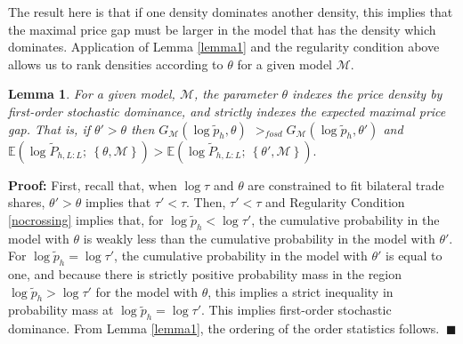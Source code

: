 \documentclass[12pt,dvips, ps2pdf]{article}
\newtheorem{lemma}{Lemma}
\begin{document}
The result here is that if one density dominates another density, this implies that the maximal price gap must be larger in the model that has the density which dominates. Application of Lemma \ref{lemma1} and the regularity condition above allows us to rank densities according to $\theta$ for a given model $\mathcal{M}$.
\begin{lemma}
\label{lemma2} For a given model, $\mathcal{M}$, the parameter $\theta$ indexes the price density by first-order stochastic dominance, and strictly indexes the expected maximal price gap. That is, if $\theta' > \theta$ then $G_{\mathcal{M}}(\log \tilde p_{h}, \theta)$ $>_{fosd} G_{\mathcal{M}}(\log \tilde p_{h}, \theta')$ and $\mathbb{E}\left(\log \tilde P_{h,L:L}; \ \left\{\theta,{\mathcal{M}}\right\} \right) > \mathbb{E}\left(\log \tilde P_{h,L:L}; \ \left\{\theta',{\mathcal{M}}\right\}\right).$
\end{lemma}
\vspace{-.25cm}
\textbf{Proof:} First, recall that, when $\log \tau$ and $\theta$ are constrained to fit bilateral trade shares, $\theta' > \theta$ implies that $\tau' < \tau$. Then, $\tau' < \tau$ and Regularity Condition \ref{nocrossing} implies that, for $\log \tilde p_{h} < \log \tau'$, the cumulative probability in the model with $\theta$ is weakly less than the cumulative probability in the model with $\theta'$. For $\log \tilde p_{h} = \log \tau'$, the cumulative probability in the model with $\theta'$ is equal to one, and because there is strictly positive probability mass in the region $\log \tilde p_{h} > \log \tau'$ for the model with $\theta$, this implies a strict inequality in probability mass at $\log \tilde p_{h} = \log \tau'$. This implies first-order stochastic dominance. From Lemma \ref{lemma1}, the ordering of the order statistics follows. $\ \blacksquare$
\end{document}
